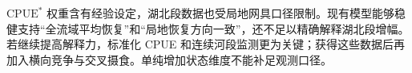 $\mathrm{CPUE}^*$ 权重含有经验设定，湖北段数据也受局地网具口径限制。现有模型能够稳健支持“全流域平均恢复”和“局地恢复方向一致”，还不足以精确解释湖北段增幅。若继续提高解释力，标准化 CPUE 和连续河段监测更为关键；获得这些数据后再加入横向竞争与交叉摄食。单纯增加状态维度不能补足观测口径。

